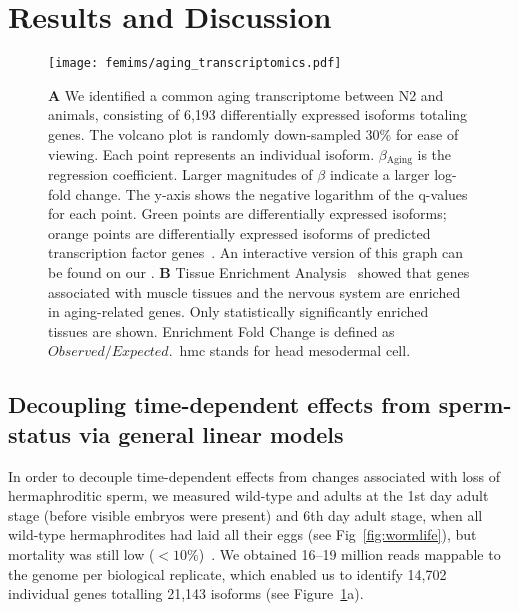\section*{Results and Discussion}
\begin{figure}[htbp]
\renewcommand{\familydefault}{\sfdefault}\normalfont{}
\centering
\texttt{[image: femims/aging\_transcriptomics.pdf]}
\caption{
\textbf{A} We identified a common aging transcriptome between N2 and
\fog{} animals, consisting of 6,193 differentially expressed isoforms totaling
\agen{} genes. The volcano plot is randomly down-sampled 30\% for ease of
viewing. Each point represents an individual isoform. $\beta{}_\mathrm{Aging}$
is the regression coefficient. Larger magnitudes of $\beta$ indicate a larger
log-fold change. The y-axis shows the negative logarithm of the q-values for
each point. Green points are differentially expressed isoforms; orange points
are differentially expressed isoforms of  predicted transcription factor
genes~\citep{Reece-Hoyes2005}. An interactive version of this graph can be found
on our \webref{}.
\textbf{B} Tissue Enrichment Analysis~\citep{Angeles-Albores2016} showed that
genes associated with muscle tissues and the nervous system are enriched in
aging-related genes. Only statistically significantly enriched tissues are shown.
Enrichment Fold Change is defined as $Observed/Expected$.\ hmc stands for head
mesodermal cell.
}
\label{fig:agingtranscriptome}
\end{figure}

\subsection*{Decoupling time-dependent effects from sperm-status via general
linear models}
\label{sub:Transcriptomics}
In order to decouple time-dependent effects from changes associated with loss
of hermaphroditic sperm, we measured wild-type and \fog{} adults at the 1st day
adult stage (before visible embryos were present) and 6th day adult stage, when
all wild-type hermaphrodites had laid all their eggs (see
Fig~\ref{fig:wormlife}), but mortality was still low
($<10\%$)~\citep{Stroustrup2013}.  We obtained 16--19 million reads mappable to
the \cel{} genome per biological replicate, which enabled us to identify
14,702 individual genes totalling 21,143 isoforms (see
Figure~\ref{fig:agingtranscriptome}a).

